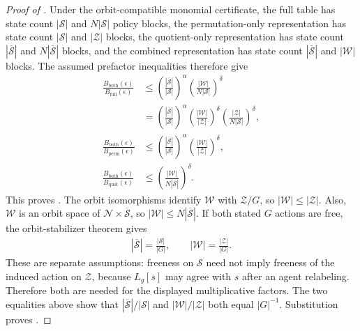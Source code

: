 \documentclass{article}
\theoremstyle{plain}
\theoremstyle{definition}
\theoremstyle{remark}
\newcommand{\N}{\mathcal{N}}
\newcommand{\St}{\mathcal{S}}
\newcommand{\abs}[1]{\left\lvert#1\right\rvert}
\newcommand{\quotient}[1]{\overline{#1}}
\begin{document}
\begin{proof}[Proof of ]
Under the orbit-compatible monomial certificate, the full table has state count
$\abs\St$ and $N\abs\St$ policy blocks, the permutation-only representation
has state count $\abs\St$ and $\abs{\mathcal Z}$ blocks, the quotient-only
representation has state count $\abs{\quotient\St}$ and
$N\abs{\quotient\St}$ blocks, and the combined representation has state count
$\abs{\quotient\St}$ and $\abs{\mathcal W}$ blocks. The assumed prefactor
inequalities therefore give
\begin{align*}
  \frac{B_{\mathrm{both}}(\epsilon)}
       {B_{\mathrm{full}}(\epsilon)}
  &\le
  \left(\frac{\abs{\quotient\St}}{\abs\St}\right)^\alpha
  \left(\frac{\abs{\mathcal W}}{N\abs\St}\right)^\delta\\
  &=
  \left(\frac{\abs{\quotient\St}}{\abs\St}\right)^\alpha
  \left(\frac{\abs{\mathcal W}}{\abs{\mathcal Z}}\right)^\delta
  \left(\frac{\abs{\mathcal Z}}{N\abs\St}\right)^\delta,\\
  \frac{B_{\mathrm{both}}(\epsilon)}
       {B_{\mathrm{perm}}(\epsilon)}
  &\le
  \left(\frac{\abs{\quotient\St}}{\abs\St}\right)^\alpha
  \left(\frac{\abs{\mathcal W}}{\abs{\mathcal Z}}\right)^\delta,\\
  \frac{B_{\mathrm{both}}(\epsilon)}
       {B_{\mathrm{quot}}(\epsilon)}
  &\le
  \left(
    \frac{\abs{\mathcal W}}
         {N\abs{\quotient\St}}
  \right)^\delta.
\end{align*}
This proves
.
The orbit isomorphisms identify
$\mathcal W$ with $\mathcal Z/G$, so
$\abs{\mathcal W}\le\abs{\mathcal Z}$. Also, $\mathcal W$ is an orbit space
of $\N\times\quotient\St$, so
$\abs{\mathcal W}\le N\abs{\quotient\St}$. If both stated $G$ actions are free,
the orbit-stabilizer theorem gives
\begin{align*}
  \abs{\quotient\St}
  =
  \frac{\abs\St}{\abs G},
  \qquad
  \abs{\mathcal W}
  =
  \frac{\abs{\mathcal Z}}{\abs G}.
\end{align*}
These are separate assumptions: freeness on $\St$ need not imply freeness of
the induced action on $\mathcal Z$, because $L_g[s]$ may agree with $s$ after
an agent relabeling.  Therefore both are needed for the displayed
multiplicative factors.  The two equalities above show that
$\abs{\quotient\St}/\abs\St$ and
$\abs{\mathcal W}/\abs{\mathcal Z}$ both equal $\abs G^{-1}$.
Substitution proves
.
\end{proof}
\end{document}
